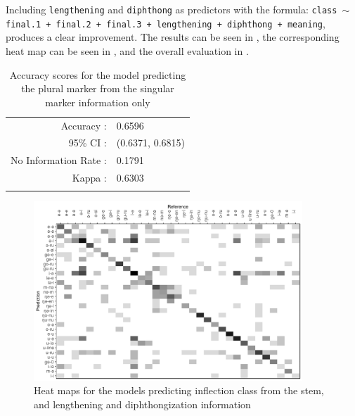 Including \texttt{lengthening} and \texttt{diphthong} as predictors with the formula: \texttt{class $\sim$ final.1 + final.2 + final.3 + lengthening + diphthong + meaning}, produces a clear improvement. The results can be seen in , the corresponding heat map can be seen in , and the overall evaluation in .

\begin{table}
  \centering
  \begin{tabular}{rl}
    \lsptoprule
    \multicolumn{2}{c}{Overall Statistics}  \\
    \midrule
    Accuracy :& 0.6596\\
    95\% CI :& (0.6371, 0.6815)\\
    No Information Rate :& 0.1791\\
    Kappa :& 0.6303\\
    \lspbottomrule
  \end{tabular}
  \caption{Accuracy scores for the model predicting the plural marker from the singular marker information only}\label{tab:class-marker-dplengthstem}
\end{table}

\begin{figure}
  \centering
  \includegraphics[width=0.9\textwidth]{./figures/kasem/p-class-sg-cm-2.pdf}
  \caption{Heat maps for the models predicting inflection class from the stem, and lengthening and diphthongization information}\label{fig:cm-class-sg-2}
\end{figure}

